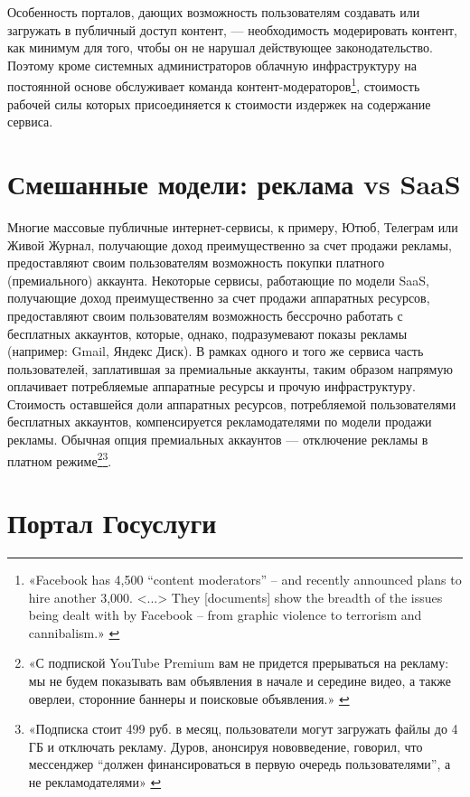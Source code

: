 \documentclass{article}
\begin{document}
Особенность порталов, дающих возможность пользователям создавать или загружать в публичный доступ контент, — необходимость модерировать контент, как минимум для того, чтобы он не нарушал действующее законодательство. Поэтому кроме системных администраторов облачную инфраструктуру на постоянной основе обслуживает команда контент-модераторов\footnote{«Facebook has 4,500 “content moderators” – and recently announced plans to hire another 3,000. <...> They [documents] show the breadth of the issues being dealt with by Facebook – from graphic violence to terrorism and cannibalism.» \cite{facebookModerators}}, стоимость рабочей силы которых присоединяется к стоимости издержек на содержание сервиса.

\section*{Смешанные модели: реклама vs SaaS}

Многие массовые публичные интернет-сервисы, к примеру, Ютюб, Телеграм или Живой Журнал, получающие доход преимущественно за счет продажи рекламы, предоставляют своим пользователям возможность покупки платного (премиального) аккаунта. Некоторые сервисы, работающие по модели SaaS, получающие доход преимущественно за счет продажи аппаратных ресурсов, предоставляют своим пользователям возможность бессрочно работать с бесплатных аккаунтов, которые, однако, подразумевают показы рекламы (например: Gmail, Яндекс Диск). В рамках одного и того же сервиса часть пользователей, заплатившая за премиальные аккаунты, таким образом напрямую оплачивает потребляемые аппаратные ресурсы и прочую инфраструктуру. Стоимость оставшейся доли аппаратных ресурсов, потребляемой пользователями бесплатных аккаунтов, компенсируется рекламодателями по модели продажи рекламы. Обычная опция премиальных аккаунтов — отключение рекламы в платном режиме\footnote{«С подпиской YouTube Premium вам не придется прерываться на рекламу: мы не будем показывать вам объявления в начале и середине видео, а также оверлеи, сторонние баннеры и поисковые объявления.» \cite{youtubePremium}}\footnote{«Подписка стоит 499 руб. в месяц, пользователи могут загружать файлы до 4 ГБ и отключать рекламу. Дуров, анонсируя нововведение, говорил, что мессенджер “должен финансироваться в первую очередь пользователями”, а не рекламодателями» \cite{telegramPremium2022}}.

\section*{Портал Госуслуги}
\end{document}
